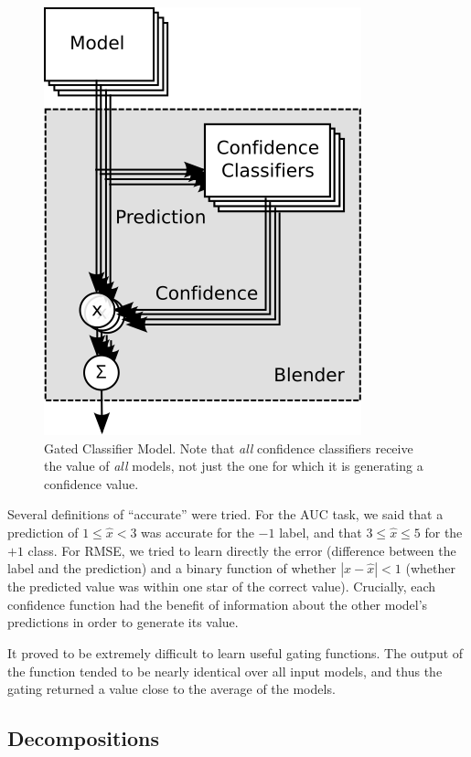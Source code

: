 \documentclass{article}
\begin{document}
\begin{figure}[t]
\vskip 0.2in
\begin{center}
\centerline{\includegraphics{gated}}
\caption{Gated Classifier Model.  Note that \emph{all} confidence classifiers receive the value of \emph{all} models, not just the one for which it is generating a confidence value.}
\label{fig:gated}
\end{center}
\vskip -0.2in
\end{figure} 

Several definitions of ``accurate'' were tried.  For the AUC task, we said that a prediction of $1 \leq \hat{x} < 3$ was accurate for the $-1$ label, and that $3 \leq \hat{x} \leq 5$ for the $+1$ class.  For RMSE, we tried to learn directly the error (difference between the label and the prediction) and a binary function of whether $|x - \hat{x}| < 1$ (whether the predicted value was within one star of the correct value).  Crucially, each confidence function had the benefit of information about the other model's predictions in order to generate its value.

It proved to be extremely difficult to learn useful gating functions.  The output of the function tended to be nearly identical over all input models, and thus the gating returned a value close to the average of the models.

\subsection{Decompositions}
\end{document}
